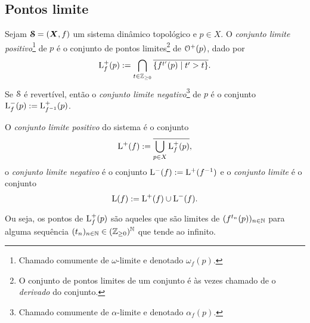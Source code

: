 \subsection{Pontos limite}

\begin{definition}
Sejam $\bm{\mathcal{S}}=(\bm X,f)$ um sistema dinâmico topológico e $p \in X$. O \emph{conjunto limite positivo}\footnote{Chamado comumente de $\omega$-limite e denotado $\omega_f(p)$.} de $p$ é o conjunto de pontos limites\footnote{O conjunto de pontos limites de um conjunto é às vezes chamado de o \emph{derivado} do conjunto.} de $\mathcal{O}^+(p)$, dado por
	\begin{equation*}
	\mathrm{L}^+_f(p) := \bigcap_{t \in \mathbb{Z}_{\geq 0}}\overline{\left\{ f^{t'}(p) \;\middle\vert\; t'>t \right\}}.
	\end{equation*}
Se $\mathcal{S}$ é revertível, então o \emph{conjunto limite negativo}\footnote{Chamado comumente de $\alpha$-limite e denotado $\alpha_f(p)$.} de $p$ é o conjunto $\mathrm{L}^-_f(p) := \mathrm{L}^+_{f^{-1}}(p)$.

O \emph{conjunto limite positivo} do sistema é o conjunto
	\begin{equation*}
	\mathrm{L}^+(f) := \overline{\bigcup_{p \in X} \mathrm{L}^+_f(p)},
	\end{equation*}
o \emph{conjunto limite negativo} é o conjunto $\mathrm{L}^-(f) := \mathrm{L}^+(f^{-1})$
e o \emph{conjunto limite} é o conjunto
	\begin{equation*}
	\mathrm{L}(f) := \mathrm{L}^+(f) \cup \mathrm{L}^-(f).
	\end{equation*}
\end{definition}

Ou seja, os pontos de $\mathrm{L}^+_f(p)$ são aqueles que são limites de $(f^{t_n}(p))_{n \in \mathbb{N}}$ para alguma sequência $(t_n)_{n \in \mathbb{N}} \in (\mathbb{Z}_{\geq 0})^{\mathbb{N}}$ que tende ao infinito.


